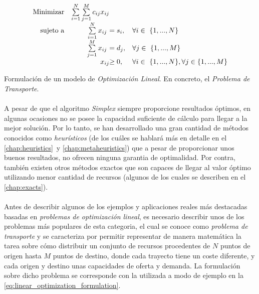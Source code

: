 \documentclass{subfiles}
\begin{document}
        \begin{eqfloat}
          \begin{equation}
            \begin{array}{rr@{}ll}
              \text{Minimizar} & \sum\limits_{i = 1}^{N}\sum\limits_{j = 1}^{M}  c_{ij}x_{ij} &                 & \\
              \text{sujeto a}	 & \sum\limits_{i = 1}^{N} x_{ij} \ &= s_{i}, & \forall i \in \{1,...,N\} \\
                               & \sum\limits_{j = 1}^{M} x_{ij} \ &= d_{j}, & \forall j \in \{1,...,M\} \\
                               &                               	x_{ij} 	&\geq 0, 	                 & \forall i \in \{1,...,N\},\forall j \in \{1,...,M\}
            \end{array}
          \end{equation}
          \caption{Formulación de un modelo de \emph{Optimización Lineal}. En concreto, el \emph{Problema de Transporte}.}
          \label{eq:linear_optimization_formulation}
        \end{eqfloat}

        \paragraph{}
        A pesar de que el algoritmo \emph{Simplex} siempre proporcione resultados óptimos, en algunas ocasiones no se posee la capacidad suficiente de cálculo para llegar a la mejor solución. Por lo tanto, se han desarrollado una gran cantidad de métodos conocidos como \emph{heurísticos} (de los cuáles se hablará más en detalle en el \cref{chap:heuristics} y \cref{chap:metaheuristics}) que a pesar de proporcionar unos buenos resultados, no ofrecen ninguna garantia de optimalidad. Por contra, también existen otros métodos exactos que son capaces de llegar al valor óptimo utilizando menor cantidad de recursos (algunos de los cuales se describen en el \cref{chap:exacts}).

        \paragraph{}
        Antes de describir algunos de los ejemplos y aplicaciones reales más destacadas basadas en \emph{problemas de optimización lineal}, es necesario describir unos de los problemas más populares de esta categoria, el cual se conoce como \emph{problema de transporte} y se caracteriza por permitir representar de manera matemática la tarea sobre cómo distribuir un conjunto de recursos procedentes de $N$ puntos de origen hasta $M$ puntos de destino, donde cada trayecto tiene un coste diferente, y cada origen y destino unas capacidades de oferta y demanda. La formulación sobre dicho problema se corresponde con la utilizada a modo de ejemplo en la \cref{eq:linear_optimization_formulation}.
\end{document}
